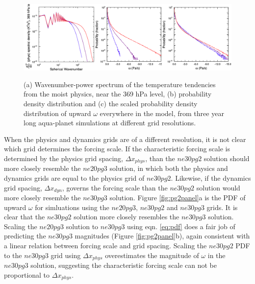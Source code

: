 \documentclass{agujournal}
\begin{document}
\begin{figure}[t]
\begin{center}
\noindent\includegraphics[width=30pc,angle=0]{figs/pg3panel.png}\\
\end{center}
\caption{(a) Wavenumber-power spectrum of the temperature tendencies from the moist physics, near the 369 hPa level, (b) probability density distribution and (c) the scaled probability density distribution of upward $\omega$ everywhere in the model, from three year long aqua-planet simulations at different grid resolutions.}
\label{fig:pg3panel}
\end{figure}

When the physics and dynamics grids are of a different resolution, it is not clear which grid determines the forcing scale. If the characteristic forcing scale is determined by the physics grid spacing, $\Delta x_{phys}$, than the $ne30pg2$ solution should more closely resemble the $ne20pg3$ solution, in which both the physics and dynamics grids are equal to the physics grid of $ne30pg2$. Likewise, if the dynamics grid spacing, $\Delta x_{dyn}$, governs the forcing scale than the $ne30pg2$ solution would more closely resemble the $ne30pg3$ solution. Figure \ref{fig:pg2panel}a is the PDF of upward $\omega$ for simluations using the $ne20pg3$, $ne30pg2$ and $ne30pg3$ grids. It is clear that the $ne30pg2$ solution more closely resembles the $ne30pg3$ solution. Scaling the $ne20pg3$ solution to $ne30pg3$ using eqn. \ref{eq:pdf} does a fair job of predicting the $ne30pg3$ magnitudes (Figure \ref{fig:pg2panel}b), again consistent with a linear relation between forcing scale and grid spacing. Scaling the $ne30pg2$ PDF to the $ne30pg3$ grid using $\Delta x_{phys}$ overestimates the magnitude of $\omega$ in the $ne30pg3$ solution, suggesting the characteristic forcing scale can not be proportional to $\Delta x_{phys}$. 
\end{document}

